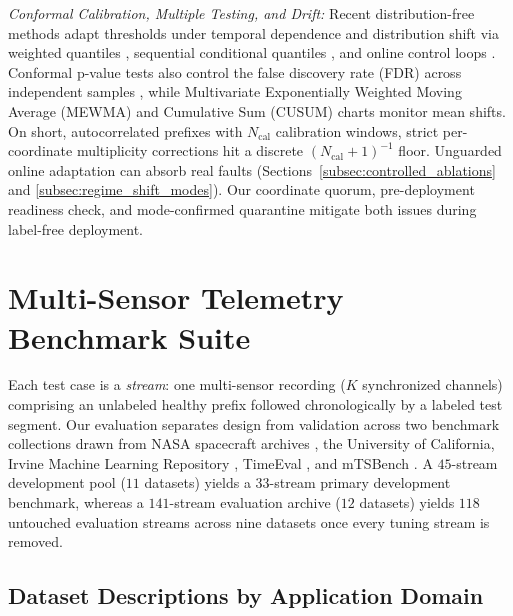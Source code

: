 \documentclass[journal]{IEEEtran}
\begin{document}
\noindent\emph{Conformal Calibration, Multiple Testing, and Drift:} Recent distribution-free methods adapt thresholds under temporal dependence and distribution shift via weighted quantiles \cite{barber2023conformal}, sequential conditional quantiles \cite{xu2023spci}, and online control loops \cite{angelopoulos2023conformalpid}. Conformal p-value tests also control the false discovery rate (FDR) across independent samples \cite{bates2023testing}, while Multivariate Exponentially Weighted Moving Average (MEWMA) and Cumulative Sum (CUSUM) charts monitor mean shifts. On short, autocorrelated prefixes with $N_{\text{cal}}$ calibration windows, strict per-coordinate multiplicity corrections hit a discrete $(N_{\text{cal}}+1)^{-1}$ floor. Unguarded online adaptation can absorb real faults (Sections~\ref{subsec:controlled_ablations} and \ref{subsec:regime_shift_modes}). Our coordinate quorum, pre-deployment readiness check, and mode-confirmed quarantine mitigate both issues during label-free deployment.

\section{Multi-Sensor Telemetry Benchmark Suite}
\label{sec:dataset}

Each test case is a \emph{stream}: one multi-sensor recording ($K$ synchronized channels) comprising an unlabeled healthy prefix followed chronologically by a labeled test segment. Our evaluation separates design from validation across two benchmark collections drawn from NASA spacecraft archives \cite{Hundman2018b}, the University of California, Irvine Machine Learning Repository \cite{bachlin2010wearable, asuncion2007uci}, TimeEval \cite{schmidl2022anomaly}, and mTSBench \cite{zhou2026mtsbench}. A $45$-stream development pool ($11$ datasets) yields a $33$-stream primary development benchmark, whereas a $141$-stream evaluation archive ($12$ datasets) yields $118$ untouched evaluation streams across nine datasets once every tuning stream is removed.

\subsection{Dataset Descriptions by Application Domain}
\label{subsec:dataset_domains}
\end{document}
